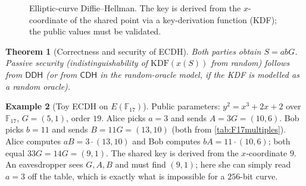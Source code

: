 \documentclass[11pt,a4paper,oneside]{book}
\theoremstyle{plain}
\newtheorem{theorem}{Theorem}[chapter]
\theoremstyle{definition}
\newtheorem{example}[theorem]{Example}
\theoremstyle{remark}
\newcommand{\F}{\mathbb{F}}
\newcommand{\CDH}{\mathsf{CDH}}
\newcommand{\DDH}{\mathsf{DDH}}
\newcommand{\sample}{\xleftarrow{\$}}
\begin{document}
\begin{figure}[ht]
\centering
{}
\caption{Elliptic-curve Diffie--Hellman. The key is derived from the $x$-coordinate of the shared point via a key-derivation function (KDF); the public values must be validated.}
\label{fig:ecdh}
\end{figure}

\begin{theorem}[Correctness and security of ECDH]
Both parties obtain $S=abG$. Passive security (indistinguishability of $\mathrm{KDF}(x(S))$ from random) follows from $\DDH$ (or from $\CDH$ in the random-oracle model, if the KDF is modelled as a random oracle).
\end{theorem}

\begin{example}[Toy ECDH on $E(\F_{17})$]
Public parameters: $y^2=x^3+2x+2$ over $\F_{17}$, $G=(5,1)$, order $19$. Alice picks $a=3$ and sends $A=3G=(10,6)$. Bob picks $b=11$ and sends $B=11G=(13,10)$ (both from \cref{tab:F17multiples}). Alice computes $aB=3\cdot(13,10)$ and Bob computes $bA=11\cdot(10,6)$; both equal $33G=14G=(9,1)$. The shared key is derived from the $x$-coordinate $9$. An eavesdropper sees $G,A,B$ and must find $(9,1)$; here she can simply read $a=3$ off the table, which is exactly what is impossible for a $256$-bit curve.
\end{example}
\end{document}
